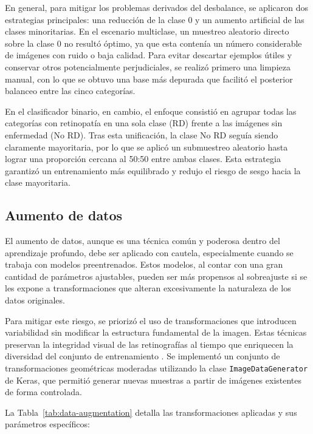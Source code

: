 En general, para mitigar los problemas derivados del desbalance, se aplicaron dos estrategias principales: una reducción de la clase 0 y un aumento artificial de las clases minoritarias. En el escenario multiclase, un muestreo aleatorio directo sobre la clase 0 no resultó óptimo, ya que esta contenía un número considerable de imágenes con ruido o baja calidad. Para evitar descartar ejemplos útiles y conservar otros potencialmente perjudiciales, se realizó primero una limpieza manual, con lo que se obtuvo una base más depurada que facilitó el posterior balanceo entre las cinco categorías.

En el clasificador binario, en cambio, el enfoque consistió en agrupar todas las categorías con retinopatía en una sola clase (RD) frente a las imágenes sin enfermedad (No RD). Tras esta unificación, la clase No RD seguía siendo claramente mayoritaria, por lo que se aplicó un submuestreo aleatorio hasta lograr una proporción cercana al 50:50 entre ambas clases. Esta estrategia garantizó un entrenamiento más equilibrado y redujo el riesgo de sesgo hacia la clase mayoritaria.

\subsection{Aumento de datos}

El aumento de datos, aunque es una técnica común y poderosa dentro del aprendizaje profundo, debe ser aplicado con cautela, especialmente cuando se trabaja con modelos preentrenados. Estos modelos, al contar con una gran cantidad de parámetros ajustables, pueden ser más propensos al sobreajuste si se les expone a transformaciones que alteran excesivamente la naturaleza de los datos originales.

Para mitigar este riesgo, se priorizó el uso de transformaciones que introducen variabilidad sin modificar la estructura fundamental de la imagen. Estas técnicas preservan la integridad visual de las retinografías al tiempo que enriquecen la diversidad del conjunto de entrenamiento . Se implementó un conjunto de transformaciones geométricas moderadas utilizando la clase \texttt{ImageDataGenerator} de Keras, que permitió generar nuevas muestras a partir de imágenes existentes de forma controlada.

La Tabla~\ref{tab:data-augmentation} detalla las transformaciones aplicadas y sus parámetros específicos:

